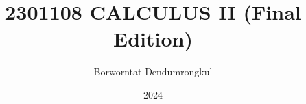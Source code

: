\documentclass[11pt,titlepage=false]{scrreprt}
\begin{document}
\setlength{\textheight}{8.5in}
\setlength{\parskip}{2ex plus 0.5ex minus 0.2ex}
\setlength{\parindent}{0pt}


\title{2301108 CALCULUS II (Final Edition)}
\author{Borworntat Dendumrongkul}
\date{2024}
\maketitle

\tableofcontents

\setcounter{secnumdepth}{1}




% 
% 
\end{document}
